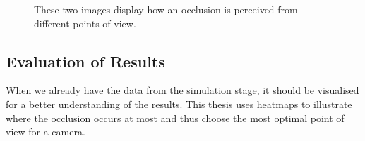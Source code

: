 \begin{figure} [h!]
  \centering
  \hfill
  \caption[Occlusion points of view]{These two images display how an occlusion is perceived from different points of view.} \label{fig:occlusion_views}
\end{figure}

\newpage
\subsection{Evaluation of Results}
When we already have the data from the simulation stage, it should be visualised for a better understanding of the results. This thesis uses heatmaps to illustrate where the occlusion occurs at most and thus choose the most optimal point of view for a camera.
